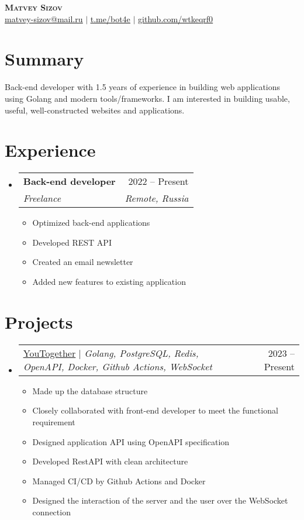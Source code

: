 \documentclass[letterpaper,11pt]{article}
\makeatletter
\newcommand{\resumeItem}[1]{
  \item\small{
    {#1 \vspace{-2pt}}
  }
}
\newcommand{\resumeSubheading}[4]{
  \vspace{-2pt}\item
    \begin{tabular*}{0.97\textwidth}[t]{l@{\extracolsep{\fill}}r}
      \textbf{#1} & #2 \\
      \textit{\small#3} & \textit{\small #4} \\
    \end{tabular*}\vspace{-7pt}
}
\newcommand{\resumeProjectHeading}[2]{
    \item
    \begin{tabular*}{0.97\textwidth}{l@{\extracolsep{\fill}}r}
      \small#1 & #2 \\
    \end{tabular*}\vspace{-7pt}
}
\newcommand{\resumeSubHeadingListStart}{\begin{itemize}[leftmargin=0.15in, label={}]}
\newcommand{\resumeSubHeadingListEnd}{\end{itemize}}
\newcommand{\resumeItemListStart}{\begin{itemize}}
\newcommand{\resumeItemListEnd}{\end{itemize}\vspace{-5pt}}
\makeatother
\begin{document}

\begin{center}
	\textbf{\Huge \scshape Matvey Sizov} \\ \vspace{1pt}
	\href{mailto:matvey-sizov@mail.ru}{\underline{matvey-sizov@mail.ru}} $|$ 
	\href{https://t.me/bot4e}{\underline{t.me/bot4e}} $|$
	\href{https://github.com/wtkeqrf0}{\underline{github.com/wtkeqrf0}}
\end{center}

\section{Summary}
\begin{itemize}[leftmargin=0.15in, label={}]
	\small{\item{Back-end developer with 1.5 years of experience in building web applications using Golang and modern tools/frameworks. I am interested in building usable, useful, well-constructed websites and applications. } \
	}
\end{itemize}


\section{Experience}
\resumeSubHeadingListStart

\resumeSubheading
{Back-end developer\emph{}}{2022 -- Present}
{Freelance}{Remote, Russia}
\resumeItemListStart
\resumeItem{Optimized back-end applications}
\resumeItem{Developed REST API}
\resumeItem{Created an email newsletter}
\resumeItem{Added new features to existing application}
\resumeItemListEnd

\resumeSubHeadingListEnd


\section{Projects}
\resumeSubHeadingListStart
\resumeProjectHeading
{\href{https://github.com/youtogether-online}{\underline{YouTogether}} $|$ \emph{Golang, PostgreSQL, Redis, OpenAPI, Docker, Github Actions, WebSocket}}{2023 -- Present}
\resumeItemListStart
\resumeItem{Made up the database structure}
\resumeItem{Closely collaborated with front-end developer to meet the functional requirement}
\resumeItem{Designed application API using OpenAPI specification}
\resumeItem{Developed RestAPI with clean architecture}
\resumeItem{Managed CI/CD by Github Actions and Docker}
\resumeItem{Designed the interaction of the server and the user over the WebSocket connection}
\resumeItemListEnd
\resumeSubHeadingListEnd
\end{document}
